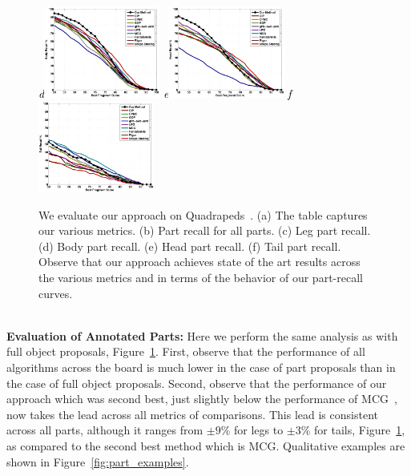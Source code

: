 \begin{figure}[p]
\begin{center}
{\footnotesize\textit{\textcolor{black}{d}}}\includegraphics[width=0.34\textwidth]{figs/body_recall.pdf}
{\footnotesize\textit{\textcolor{black}{e}}}\includegraphics[width=0.34\textwidth]{figs/head_recall.pdf}
{\footnotesize\textit{\textcolor{black}{f}}}\includegraphics[width=0.34\textwidth]{figs/tail_recall.pdf}

\end{center}
\caption{ We evaluate our approach on Quadrapeds~\cite{Wang:etal:ICCV15}. (a) The table captures our various metrics. (b) Part recall for all parts. (c) Leg part recall. (d) Body part recall. (e) Head part recall. (f) Tail part recall. Observe that our approach achieves state of the art results across the various metrics and in terms of the behavior of our part-recall curves. }
\label{fig:part_results} 
\end{figure}


\noindent\\
{\bf Evaluation of Annotated Parts: } Here we perform the same analysis as with full object proposals, Figure~\ref{fig:part_results}. First, observe that the performance of all algorithms across the board is much lower in the case of part proposals than in the case of full object proposals. Second, observe that the performance of our approach which was second best, just slightly below the performance of MCG~\cite{Arbelaez:etal:CVPR14}, now takes the lead across all metrics of comparisons. This lead is consistent across all parts, although it ranges from $\pm 9\%$ for legs to  $\pm 3\%$ for tails, Figure~\ref{fig:part_results}, as compared to the second best method which is MCG. Qualitative examples are shown in Figure~\ref{fig:part_examples}.


